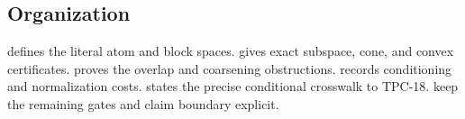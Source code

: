 \subsection{Organization}

 defines the literal atom and block spaces.
 gives exact subspace, cone, and convex
certificates.   proves the overlap and
coarsening obstructions.   records
conditioning and normalization costs.
 states the precise conditional crosswalk to
TPC-18.   keep the
remaining gates and claim boundary explicit.
